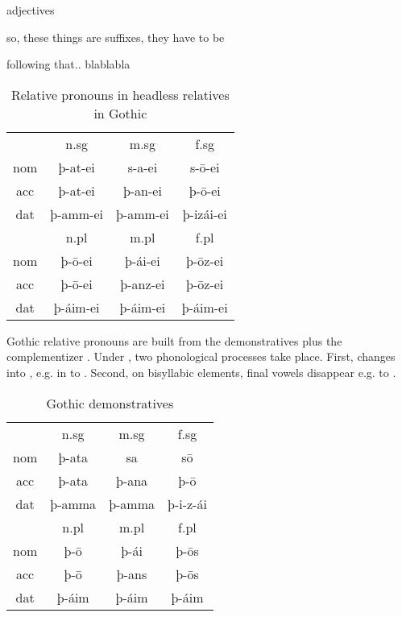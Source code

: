 adjectives

so, these things are suffixes, they have to be

following that.. blablabla



\begin{table}[H]
	\center
	\caption {Relative pronouns in headless relatives in Gothic}
		\begin{tabular}{cccc}
		\toprule
							& \ac{n}.\ac{sg} 	& \ac{m}.\ac{sg}	& \ac{f}.\ac{sg}  \\
		 						\cmidrule{2-4}
    \ac{nom} 	& þ-at-ei 	 			& s-a-ei 					& s-ō-ei					\\
    \ac{acc}	& þ-at-ei    			& þ-an-ei  				& þ-ō-ei  				\\
    \ac{dat} 	& þ-amm-ei 				& þ-amm-ei				& þ-izái-ei 			\\
		\bottomrule
    					& \ac{n}.\ac{pl}	& \ac{m}.\ac{pl}	& \ac{f}.\ac{pl}	\\
						    \cmidrule{2-4}
    \ac{nom} 	& þ-ō-ei					&	þ-ái-ei					&	þ-ōz-ei					\\
    \ac{acc} 	& þ-ō-ei 					&	þ-anz-ei				&	þ-ōz-ei					\\
    \ac{dat} 	& þ-áim-ei				&	þ-áim-ei 				&	þ-áim-ei 				\\
    \bottomrule
		\end{tabular}
\end{table}

Gothic relative pronouns are built from the demonstratives plus the complementizer . Under , two phonological processes take place. First,  changes into , e.g. in  to . Second, on bisyllabic elements, final vowels disappear e.g.  to .

\begin{table}[H]
	\center
	\caption {Gothic demonstratives}
		\begin{tabular}{cccc}
		\toprule
							& \ac{n}.\ac{sg} 	& \ac{m}.\ac{sg}	& \ac{f}.\ac{sg}  \\
		 						\cmidrule{2-4}
    \ac{nom} 	& þ-ata 	 			  & sa  			  		& sō		    			\\
    \ac{acc}	& þ-ata    	   		& þ-ana  	  	 		& þ-ō     				\\
    \ac{dat} 	& þ-amma 		   		& þ-amma  				& þ-i-z-ái  			\\
		\bottomrule
    					& \ac{n}.\ac{pl}	& \ac{m}.\ac{pl}	& \ac{f}.\ac{pl}	\\
						    \cmidrule{2-4}
    \ac{nom} 	& þ-ō		     			&	þ-ái   					&	þ-ōs	  				\\
    \ac{acc} 	& þ-ō    					&	þ-ans   				&	þ-ōs	   				\\
    \ac{dat} 	& þ-áim   				&	þ-áim    				&	þ-áim   				\\
    \bottomrule
		\end{tabular}
\end{table}

